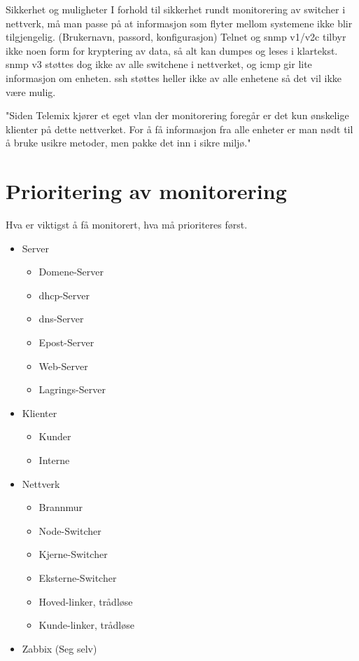 \begin{tanke}{Sikkerhet og muligheter}
    I forhold til sikkerhet rundt monitorering av switcher i nettverk, må man passe på at informasjon som flyter mellom systemene ikke blir tilgjengelig. (Brukernavn, passord, konfigurasjon)
    Telnet og \gls{snmp} v1/v2c tilbyr ikke noen form for kryptering av data, så alt kan dumpes og leses i klartekst. \gls{snmp} v3 støttes dog ikke av alle switchene i nettverket, og \gls{icmp} gir lite informasjon om enheten.
    \gls{ssh} støttes heller ikke av alle enhetene så det vil ikke være mulig.
    
    "Siden Telemix kjører et eget \gls{vlan} der monitorering foregår er det kun ønskelige klienter på dette nettverket. For å få informasjon fra alle enheter er man nødt til å bruke usikre metoder, men pakke det inn i sikre miljø."
\end{tanke}

\section{Prioritering av monitorering}

Hva er viktigst å få monitorert, hva må prioriteres først.

\begin{itemize}
    \item Server
    \begin{itemize}
        \item Domene-Server
        \item \gls{dhcp}-Server
        \item \gls{dns}-Server
        \item Epost-Server
        \item Web-Server
        \item Lagrings-Server
    \end{itemize}
    \item Klienter
    \begin{itemize}
        \item Kunder
        \item Interne
    \end{itemize}
    \item Nettverk
    \begin{itemize}
        \item Brannmur
        \item Node-Switcher
        \item Kjerne-Switcher
        \item Eksterne-Switcher
        \item Hoved-linker, trådløse
        \item Kunde-linker, trådløse
    \end{itemize}
    \item Zabbix (Seg selv)
\end{itemize}

